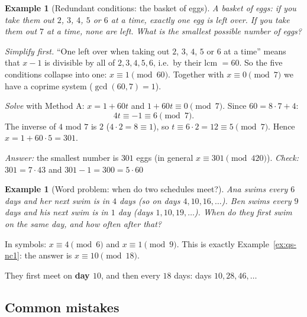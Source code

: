 \documentclass[11pt]{article}
\theoremstyle{definition}
\newtheorem{example}[theorem]{Example}
\theoremstyle{remark}
\begin{document}
\begin{example}[Redundant conditions: the basket of eggs]\label{ex:qs-eggs}
\emph{A basket of eggs: if you take them out $2$, $3$, $4$, $5$ or $6$ at a time, exactly one egg is left over. If you take them out $7$ at a time, none are left. What is the smallest possible number of eggs?}

\emph{Simplify first.} ``One left over when taking out $2$, $3$, $4$, $5$ or $6$ at a time'' means that $x-1$ is divisible by all of $2,3,4,5,6$, i.e.\ by their lcm $=60$. So the five conditions collapse into one: $x\equiv1\pmod{60}$. Together with $x\equiv0\pmod7$ we have a coprime system ($\gcd(60,7)=1$).

\emph{Solve} with Method A: $x=1+60t$ and $1+60t\equiv0\pmod 7$. Since $60=8\cdot7+4$:
\[
4t\equiv-1\equiv 6\pmod 7.
\]
The inverse of $4$ mod $7$ is $2$ ($4\cdot2=8\equiv1$), so $t\equiv 6\cdot2=12\equiv5\pmod 7$. Hence $x=1+60\cdot5=301$.

\emph{Answer:} the smallest number is $301$ eggs (in general $x\equiv301\pmod{420}$). \emph{Check:} $301=7\cdot43$ \checkmark and $301-1=300=5\cdot60$ \checkmark
\end{example}

\begin{example}[Word problem: when do two schedules meet?]\label{ex:qs-gym}
\emph{Ana swims every $6$ days and her next swim is in $4$ days (so on days $4,10,16,\dots$). Ben swims every $9$ days and his next swim is in $1$ day (days $1,10,19,\dots$). When do they first swim on the same day, and how often after that?}

In symbols: $x\equiv4\pmod6$ and $x\equiv1\pmod9$. This is exactly Example~\ref{ex:qs-nc1}: the answer is $x\equiv10\pmod{18}$.

They first meet on \textbf{day $10$}, and then every $18$ days: days $10,28,46,\dots$ 
\end{example}

\subsection{Common mistakes}
\end{document}
